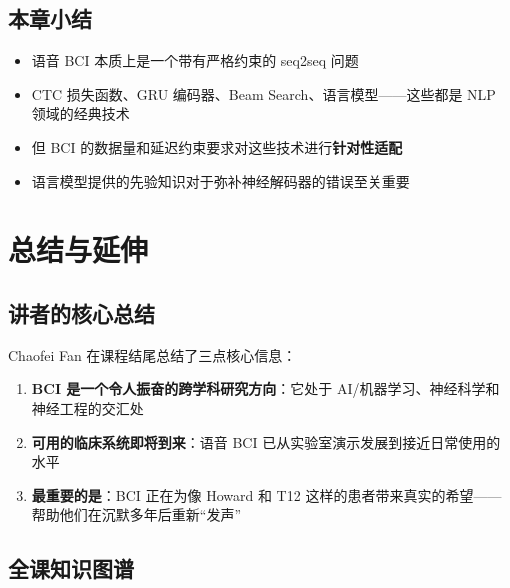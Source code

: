 \documentclass[a4paper]{article}
\begin{document}
\subsection{本章小结}

\begin{itemize}
    \item 语音 BCI 本质上是一个带有严格约束的 seq2seq 问题
    \item CTC 损失函数、GRU 编码器、Beam Search、语言模型——这些都是 NLP 领域的经典技术
    \item 但 BCI 的数据量和延迟约束要求对这些技术进行\textbf{针对性适配}
    \item 语言模型提供的先验知识对于弥补神经解码器的错误至关重要
\end{itemize}


\section{总结与延伸}

\subsection{讲者的核心总结}

Chaofei Fan 在课程结尾总结了三点核心信息：

\begin{enumerate}
    \item \textbf{BCI 是一个令人振奋的跨学科研究方向}：它处于 AI/机器学习、神经科学和神经工程的交汇处
    \item \textbf{可用的临床系统即将到来}：语音 BCI 已从实验室演示发展到接近日常使用的水平
    \item \textbf{最重要的是}：BCI 正在为像 Howard 和 T12 这样的患者带来真实的希望——帮助他们在沉默多年后重新``发声''
\end{enumerate}

\subsection{全课知识图谱}
\end{document}
